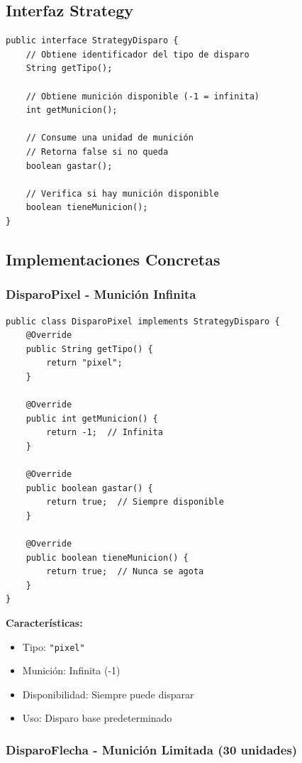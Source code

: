 \documentclass[12pt]{article}
\begin{document}
\subsection{Interfaz Strategy}

\begin{lstlisting}
public interface StrategyDisparo {
    // Obtiene identificador del tipo de disparo
    String getTipo();
    
    // Obtiene munición disponible (-1 = infinita)
    int getMunicion();
    
    // Consume una unidad de munición
    // Retorna false si no queda
    boolean gastar();
    
    // Verifica si hay munición disponible
    boolean tieneMunicion();
}
\end{lstlisting}

\subsection{Implementaciones Concretas}

\subsubsection{DisparoPixel - Munición Infinita}

\begin{lstlisting}
public class DisparoPixel implements StrategyDisparo {
    @Override
    public String getTipo() {
        return "pixel";
    }
    
    @Override
    public int getMunicion() {
        return -1;  // Infinita
    }
    
    @Override
    public boolean gastar() {
        return true;  // Siempre disponible
    }
    
    @Override
    public boolean tieneMunicion() {
        return true;  // Nunca se agota
    }
}
\end{lstlisting}

\textbf{Características:}
\begin{itemize}
    \item Tipo: \texttt{"pixel"}
    \item Munición: Infinita (-1)
    \item Disponibilidad: Siempre puede disparar
    \item Uso: Disparo base predeterminado
\end{itemize}

\subsubsection{DisparoFlecha - Munición Limitada (30 unidades)}
\end{document}
